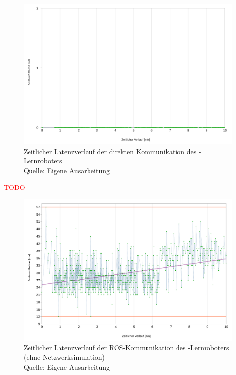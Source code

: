 \begin{figure}[htb]
	\centering
	\includegraphics[width=1.04\textwidth]{images/ergebnisse/Messung_der_direkten_Kommunikation}
	\caption[Zeitlicher Latenzverlauf der direkten Kommunikation des -Lernroboters]{Zeitlicher Latenzverlauf der direkten Kommunikation des -Lernroboters\\Quelle: Eigene Ausarbeitung}
	\label{fig:measurement_robot_direct_communication}
\end{figure}
\FloatBarrier

\textcolor{red}{TODO}

\begin{figure}[htb]
	\centering
	\includegraphics[width=1.04\textwidth]{images/ergebnisse/Messung_der_ROS_Kommunikation_App_und_keine_Netzwerksimulation}
	\caption[Zeitlicher Latenzverlauf der ROS-Kommunikation des -Lernroboters (ohne Netzwerksimulation)]{Zeitlicher Latenzverlauf der ROS-Kommunikation des -Lernroboters (ohne Netzwerksimulation)\\Quelle: Eigene Ausarbeitung}
	\label{fig:measurement_robot_ros_without_network_simulation}
\end{figure}
\FloatBarrier

